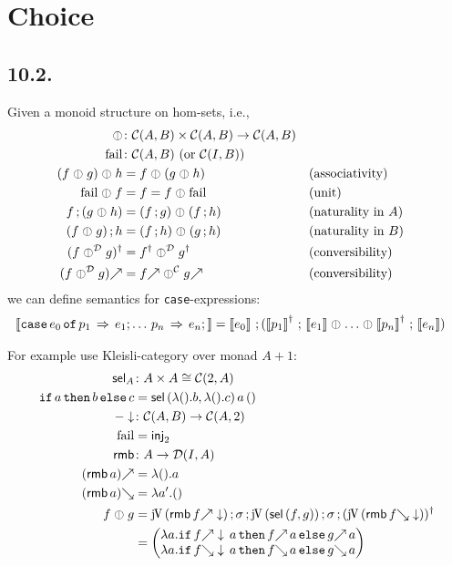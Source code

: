 \documentclass[runningheads,envcountsame]{llncs}
\begin{document}

\newcommand{\hl}[1]{%
  \colorbox{yellow!50}{$\displaystyle#1$}}

\section{Choice}

\subsection{10.2.}
Given a monoid structure on hom-sets, i.e., \begin{align*}
    \orelse&\colon \homC{A}{B} \times \homC{A}{B} \to \homC{A}{B} \\
    \fail&\colon \homC{A}{B} \text{ (or $\homC{I}{B}$)} \\
    (f \orelse g) \orelse h &= f \orelse (g \orelse h) && \text{(associativity)}\\
    \fail \orelse f &= f = f \orelse \fail && \text{(unit)}\\
    \comp{f}{(g \orelse h)} &= (\comp{f}{g}) \orelse (\comp{f}{h}) &&\text{(naturality in $A$)} \\
    \comp{(f \orelse g) }{h} &= (\comp{f}{h}) \orelse (\comp{g}{h}) &&\text{(naturality in $B$)} \\
    \rev{(f \orelse[\D] g)} &= \rev{f} \orelse[\D] \rev{g} &&\text{(conversibility)} \\
    \f{(f \orelse[\D] g)} &= \f{f} \orelse[\C] \f{g} &&\text{(conversibility)}
\end{align*}
we can define semantics for \texttt{case}-expressions: \begin{align*}
    \sem{\ecaseof{e_0}{\ecase{p_1}{e_1} \dots \ecase{p_n}{e_n}}} &=
        \comp{\sem{e_0}}{(\comp{\rev{\sem{p_1}}}{\sem{e_1}} \orelse \dots \orelse \comp{\rev{\sem{p_n}}}{\sem{e_n}})}
\end{align*}

For example use Kleisli-category over monad $A + 1$: \begin{align}
    \select_A &\colon A \times A \cong \homC{2}{A} \\
    \eifthenelse{a}{b}{c} &= \select\,(\elam{\eunit}{b}, \elam{\eunit}{c})\,a\,\eunit \\
    \defined{-} &\colon \homC{A}{B} \to \homC{A}{2} \\
    \fail &= \mathsf{inj}_2 \\
    \remember &\colon A \to \homD{I}{A} \\
    \f{(\remember\,a)} &= \elam{\eunit}{a} \\
    \b{(\remember\,a)} &= \elam{a'}{\eunit} \\
    f \orelse g &= \comp{\juncurry\,(\remember\,\defined{\f{f}})}{\comp{\swap}{\comp{\juncurry\,(\select\,(f, g))}{\comp{\swap}{\rev{(\juncurry\,(\remember\,\defined{\b{f}}))}}}}} \\
        &= \janus{
            \lambda a. \eifthenelse{\defined{\f{f}}\,a}{\f{f}\,a}{\f{g}\,a}
        }{\lambda a. \eifthenelse{\defined{\b{f}}\,a}{\b{f}\,a}{\b{g}\,a}}
\end{align}
\end{document}
